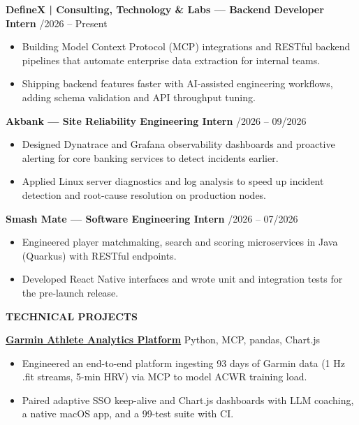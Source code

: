 \documentclass[a4paper]{article}
\newcommand{\sechead}[1]{%
    \vspace{3.8pt}%
    {\centering\fontsize{10.2}{12.2}\textbf{\MakeUppercase{#1}}\par}%
    \vspace{1.8pt}%
}
\newcommand{\entry}[2]{%
    {\fontsize{9.2}{11.5}\textbf{#1}} \hfill {\fontsize{8.4}{10.6}\selectfont #2} \par
}
\newcommand{\desc}[1]{%
    {\fontsize{8.0}{10.2}\selectfont #1}%
}
\begin{document}
\entry{DefineX | Consulting, Technology \& Labs \textnormal{--- Backend Developer Intern}}{09/2026 -- Present}
\begin{itemize}[leftmargin=1.1em, itemsep=0.5pt, parsep=0pt, topsep=0.6pt]
   \item \desc{Building Model Context Protocol (MCP) integrations and RESTful backend pipelines that automate enterprise data extraction for internal teams.}
   \item \desc{Shipping backend features faster with AI-assisted engineering workflows, adding schema validation and API throughput tuning.}
\end{itemize}
\vspace{1.5pt}

\entry{Akbank \textnormal{--- Site Reliability Engineering Intern}}{07/2026 -- 09/2026}
\begin{itemize}[leftmargin=1.1em, itemsep=0.5pt, parsep=0pt, topsep=0.6pt]
   \item \desc{Designed Dynatrace and Grafana observability dashboards and proactive alerting for core banking services to detect incidents earlier.}
   \item \desc{Applied Linux server diagnostics and log analysis to speed up incident detection and root-cause resolution on production nodes.}
\end{itemize}
\vspace{1.5pt}

\entry{Smash Mate \textnormal{--- Software Engineering Intern}}{06/2026 -- 07/2026}
\begin{itemize}[leftmargin=1.1em, itemsep=0.5pt, parsep=0pt, topsep=0.6pt]
   \item \desc{Engineered player matchmaking, search and scoring microservices in Java (Quarkus) with RESTful endpoints.}
   \item \desc{Developed React Native interfaces and wrote unit and integration tests for the pre-launch release.}
\end{itemize}

\sechead{Technical Projects}

\entry{\href{https://github.com/yigitsarpavci/garmin-athlete-analytics-platform}{Garmin Athlete Analytics Platform}}{Python, MCP, pandas, Chart.js}
\begin{itemize}[leftmargin=1.1em, itemsep=0.5pt, parsep=0pt, topsep=0.6pt]
   \item \desc{Engineered an end-to-end platform ingesting 93 days of Garmin data (1 Hz .fit streams, 5-min HRV) via MCP to model ACWR training load.}
   \item \desc{Paired adaptive SSO keep-alive and Chart.js dashboards with LLM coaching, a native macOS app, and a 99-test suite with CI.}
\end{itemize}
\vspace{1.5pt}
\end{document}
